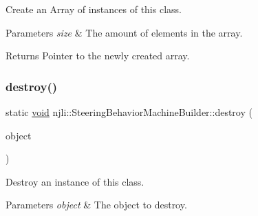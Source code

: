 Create an Array of instances of this class.


\begin{DoxyParams}{Parameters}
{\em size} & The amount of elements in the array.\\
\hline
\end{DoxyParams}
\begin{DoxyReturn}{Returns}
Pointer to the newly created array. 
\end{DoxyReturn}
\mbox{\label{classnjli_1_1_steering_behavior_machine_builder_ad07f36443d63f799dcea45529984f592}} 
\subsubsection{\texorpdfstring{destroy()}{destroy()}}
{\footnotesize\ttfamily static \mbox{\hyperlink{_thread_8h_af1e856da2e658414cb2456cb6f7ebc66}{void}} njli\+::\+Steering\+Behavior\+Machine\+Builder\+::destroy (\begin{DoxyParamCaption}\item[{\mbox{\hyperlink{classnjli_1_1_steering_behavior_machine_builder}{Steering\+Behavior\+Machine\+Builder}} $\ast$}]{object }\end{DoxyParamCaption})\hspace{0.3cm}{\ttfamily [static]}}

Destroy an instance of this class.


\begin{DoxyParams}{Parameters}
{\em object} & The object to destroy. \\
\hline
\end{DoxyParams}
\mbox{\label{classnjli_1_1_steering_behavior_machine_builder_abaf463e018aa0fed6453cc828945b91c}} 
